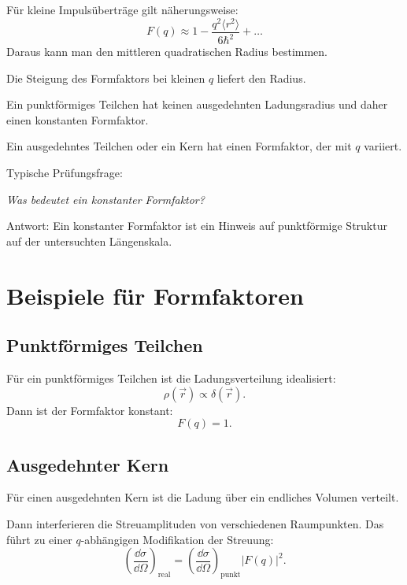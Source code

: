 \begin{formulabox}
Für kleine Impulsüberträge gilt näherungsweise:
\[
    F(q)
    \approx
    1
    -
    \frac{q^2\langle r^2\rangle}{6\hbar^2}
    +\ldots
\]
Daraus kann man den mittleren quadratischen Radius bestimmen.
\end{formulabox}

\begin{conceptbox}
Die Steigung des Formfaktors bei kleinen $q$ liefert den Radius.

Ein punktförmiges Teilchen hat keinen ausgedehnten Ladungsradius und daher einen
konstanten Formfaktor.

Ein ausgedehntes Teilchen oder ein Kern hat einen Formfaktor, der mit $q$ variiert.
\end{conceptbox}

\begin{examtipbox}
Typische Prüfungsfrage:
\begin{center}
\emph{Was bedeutet ein konstanter Formfaktor?}
\end{center}

Antwort:
Ein konstanter Formfaktor ist ein Hinweis auf punktförmige Struktur auf der untersuchten
Längenskala.
\end{examtipbox}

\section{Beispiele für Formfaktoren}

\subsection{Punktförmiges Teilchen}

\begin{conceptbox}
Für ein punktförmiges Teilchen ist die Ladungsverteilung idealisiert:
\[
    \rho(\vec r)\propto \delta(\vec r).
\]
Dann ist der Formfaktor konstant:
\[
    F(q)=1.
\]
\end{conceptbox}

\subsection{Ausgedehnter Kern}

\begin{conceptbox}
Für einen ausgedehnten Kern ist die Ladung über ein endliches Volumen verteilt.

Dann interferieren die Streuamplituden von verschiedenen Raumpunkten.
Das führt zu einer $q$-abhängigen Modifikation der Streuung:
\[
    \left(\frac{\dd\sigma}{\dd\Omega}\right)_{\mathrm{real}}
    =
    \left(\frac{\dd\sigma}{\dd\Omega}\right)_{\mathrm{punkt}}
    |F(q)|^2.
\]
\end{conceptbox}

